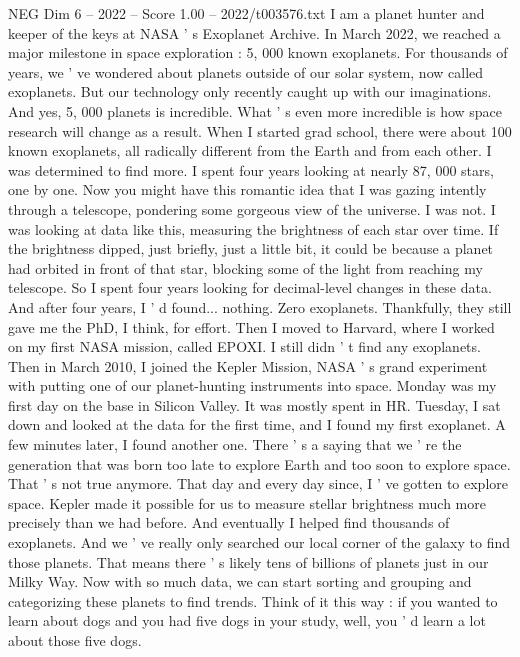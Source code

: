 \begin{textsample}{NEG Dim 6 – 2022 – Score 1.00 – 2022/t003576.txt}  \label{ex:f6_neg_012}
I am a planet hunter and keeper of the keys at NASA ' s Exoplanet Archive.
In March 2022, we reached a major milestone in space exploration : 5, 000 known exoplanets.
For thousands of years, we ' ve wondered about planets outside of our solar system, now called exoplanets.
But our technology only recently caught up with our imaginations.
And yes, 5, 000 planets is incredible.
What ' s even more incredible is how space research will change as a result.
When I started grad school, there were about 100 known exoplanets, all radically different from the Earth and from each other.
I was determined to find more.
I spent four years looking at nearly 87, 000 stars, one by one.
Now you might have this romantic idea that I was gazing intently through a telescope, pondering some gorgeous view of the universe.
I was not.
I was looking at data like this, measuring the brightness of each star over time.
If the brightness dipped, just briefly, just a little bit, it could be because a planet had orbited in front of that star, blocking some of the light from reaching my telescope.
So I spent four years looking for decimal-level changes in these data.
And after four years, I ' d found... nothing.
Zero exoplanets.
Thankfully, they still gave me the PhD, I think, for effort.
Then I moved to Harvard, where I worked on my first NASA mission, called EPOXI.
I still didn ' t find any exoplanets.
Then in March 2010, I joined the Kepler Mission, NASA ' s grand experiment with putting one of our planet-hunting instruments into space.
Monday was my first day on the base in Silicon Valley.
It was mostly spent in HR.
Tuesday, I sat down and looked at the data for the first time, and I found my first exoplanet.
A few minutes later, I found another one.
There ' s a saying that we ' re the generation that was born too late to explore Earth and too soon to explore space.
That ' s not true anymore.
That day and every day since, I ' ve gotten to explore space.
Kepler made it possible for us to measure stellar brightness much more precisely than we had before.
And eventually I helped find thousands of exoplanets.
And we ' ve really only searched our local corner of the galaxy to find those planets.
That means there ' s likely tens of billions of planets just in our Milky Way.
Now with so much data, we can start sorting and grouping and categorizing these planets to find trends.
Think of it this way : if you wanted to learn about dogs and you had five dogs in your study, well, you ' d learn a lot about those five dogs.

\end{textsample}
